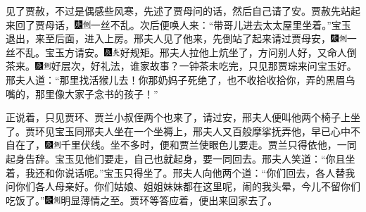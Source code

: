 见了贾赦，不过是偶感些风寒，先述了贾母问的话，然后自己请了安。贾赦先站起来回了贾母话，{\includegraphics[width=3mm]{../Images/00004}\includegraphics[width=3mm]{../Images/00011}\footnotesize \kaishu 一丝不乱。}次后便唤人来：``带哥儿进去太太屋里坐着。''宝玉退出，来至后面，进入上房。邢夫人见了他来，先倒站了起来请过贾母安，{\includegraphics[width=3mm]{../Images/00004}\includegraphics[width=3mm]{../Images/00011}\footnotesize \kaishu 一丝不乱。}宝玉方请安。{\includegraphics[width=3mm]{../Images/00009}\includegraphics[width=3mm]{../Images/00012}\footnotesize \kaishu 好规矩。}邢夫人拉他上炕坐了，方问别人好，又命人倒茶来。{\includegraphics[width=3mm]{../Images/00004}\includegraphics[width=3mm]{../Images/00011}\footnotesize \kaishu 好层次，好礼法，谁家故事？}一钟茶未吃完，只见那贾琮来问宝玉好。邢夫人道：``那里找活猴儿去！你那奶妈子死绝了，也不收拾收拾你，弄的黑眉乌嘴的，那里像大家子念书的孩子！''

正说着，只见贾环、贾兰小叔侄两个也来了，请过安，邢夫人便叫他两个椅子上坐了。贾环见宝玉同邢夫人坐在一个坐褥上，邢夫人又百般摩挲抚弄他，早已心中不自在了，{\includegraphics[width=3mm]{../Images/00004}\includegraphics[width=3mm]{../Images/00011}\footnotesize \kaishu 千里伏线。}坐不多时，便和贾兰使眼色儿要走。贾兰只得依他，一同起身告辞。宝玉见他们要走，自己也就起身，要一同回去。邢夫人笑道：``你且坐着，我还和你说话呢。''宝玉只得坐了。邢夫人向他两个道：``你们回去，各人替我问你们各人母亲好。你们姑娘、姐姐妹妹都在这里呢，闹的我头晕，今儿不留你们吃饭了。''{\includegraphics[width=3mm]{../Images/00004}\includegraphics[width=3mm]{../Images/00011}\footnotesize \kaishu 明显薄情之至。}贾环等答应着，便出来回家去了。

